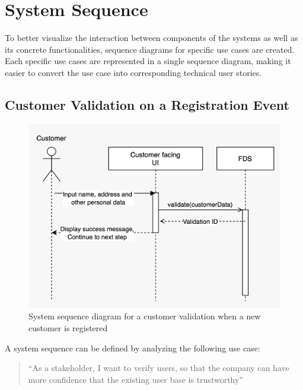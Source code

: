 \section{System Sequence}
 \label{section:sequence}
 
To better visualize the interaction between components of the systems as well as its concrete functionalities, sequence diagrams for specific use cases are created. Each specific use cases are represented in a single sequence diagram, making it easier to convert the use case into corresponding technical user stories.

\subsection{Customer Validation on a Registration Event}

\begin{figure}[!ht]
 \includegraphics[width=\textwidth]{diagrams/sequence_registration.jpeg}
 \caption{System sequence diagram for a customer validation when a new customer is registered}
\end{figure}

A system sequence can be defined by analyzing the following use case:

\begin{quotation}
 \enquote{As a stakeholder, I want to verify users, so that the company can have more confidence that the existing user base is trustworthy} 
\end{quotation}


